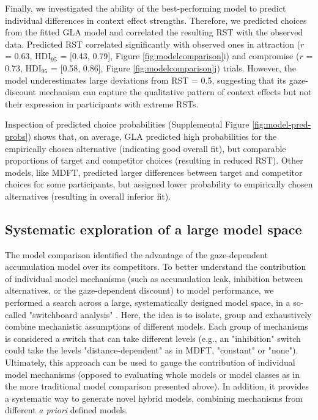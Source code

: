 \documentclass[11pt, a4paper]{article}
\begin{document}
Finally, we investigated the ability of the best-performing model to predict individual differences in context effect strengths. Therefore, we predicted choices from the fitted GLA model and correlated the resulting RST with the observed data. Predicted RST correlated significantly with observed ones in attraction ($r$ = 0.63, HDI$_{95}$ = [0.43, 0.79], Figure \ref{fig:modelcomparison}i) and compromise ($r$ = 0.73, HDI$_{95}$ = [0.58, 0.86], Figure \ref{fig:modelcomparison}j) trials. However, the model underestimates large deviations from RST = 0.5, suggesting that its gaze-discount mechanism can capture the qualitative pattern of context effects but not their expression in participants with extreme RSTs. 

Inspection of predicted choice probabilities (Supplemental Figure \ref{fig:model-pred-probs}) shows that, on average, GLA predicted high probabilities for the empirically chosen alternative (indicating good overall fit), but comparable proportions of target and competitor choices (resulting in reduced RST). Other models, like MDFT, predicted larger differences between target and competitor choices for some participants, but assigned lower probability to empirically chosen alternatives (resulting in overall inferior fit).

\subsection*{Systematic exploration of a large model space}

The model comparison identified the advantage of the gaze-dependent accumulation model over its competitors. To better understand the contribution of individual model mechanisms (such as accumulation leak, inhibition between alternatives, or the gaze-dependent discount) to model performance, we performed a search across a large, systematically designed model space, in a so-called "switchboard analysis" \parencite[see][]{turner2018CompetingTheoriesMultialternative}. Here, the idea is to isolate, group and exhaustively combine mechanistic assumptions of different models. Each group of mechanisms is considered a switch that can take different levels (e.g., an "inhibition" switch could take the levels "distance-dependent" as in MDFT, "constant" or "none"). Ultimately, this approach can be used to gauge the contribution of individual model mechanisms (opposed to evaluating whole models or model classes as in the more traditional model comparison presented above). In addition, it provides a systematic way to generate novel hybrid models, combining mechanisms from different \emph{a priori} defined models.
\end{document}
